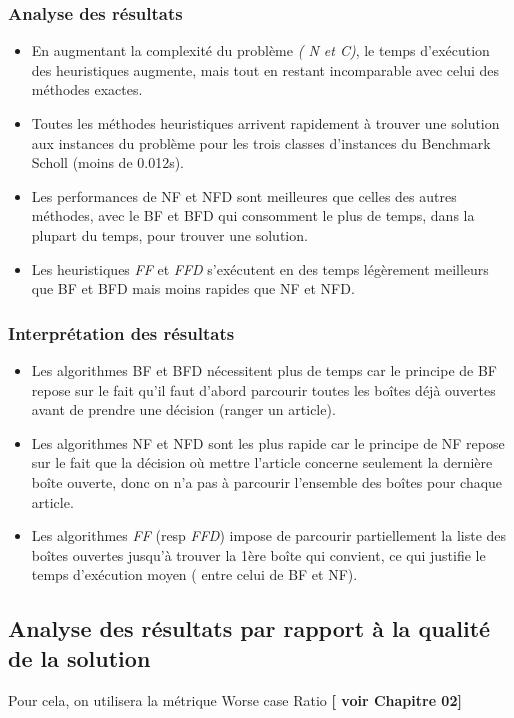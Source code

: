 \documentclass[class=article, crop=false]{standalone}
\begin{document}
\subsubsection{Analyse des résultats}
\begin{itemize}
    \item En augmentant la complexité du problème \emph{( N et C)}, le temps d'exécution des heuristiques augmente, mais tout en restant incomparable avec celui des méthodes exactes.
    \item Toutes les méthodes heuristiques arrivent rapidement à trouver une solution aux instances du problème pour les trois classes d’instances du Benchmark Scholl (moins de 0.012s).
    \item Les performances de NF et NFD sont meilleures que celles des autres méthodes, avec le BF et BFD qui consomment le plus de temps, dans la plupart du temps, pour trouver une solution.
    \item Les heuristiques \emph{FF} et \emph{FFD} s’exécutent en des temps légèrement meilleurs que BF et BFD mais moins rapides que NF et NFD.
\end{itemize}

\subsubsection{Interprétation des résultats}
\begin{itemize}
    \item Les algorithmes BF et BFD nécessitent plus de temps car le principe de BF repose sur le fait qu’il faut d’abord parcourir toutes les boîtes déjà ouvertes avant de prendre une décision (ranger un article).
    \item Les algorithmes NF et NFD sont les plus rapide car le principe de NF repose sur le fait que la décision où mettre l’article concerne seulement la dernière boîte ouverte, donc on n’a pas à parcourir l’ensemble des boîtes pour chaque article.
    \item Les algorithmes \emph{FF} (resp \emph{FFD}) impose de parcourir partiellement la liste des boîtes ouvertes jusqu’à trouver la 1ère boîte qui convient, ce qui justifie le temps d’exécution moyen ( entre celui de BF et NF).
\end{itemize}

\subsection{Analyse des résultats par rapport à la qualité de la solution}
Pour cela, on utilisera la métrique Worse case Ratio \textbf{[ voir Chapitre 02]} \\
\end{document}
